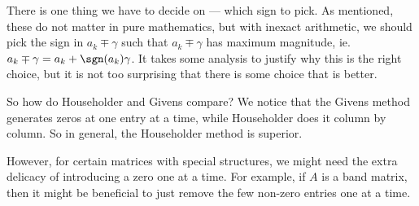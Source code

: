\documentclass[a4paper]{article}
\begin{document}
There is one thing we have to decide on --- which sign to pick. As mentioned, these do not matter in pure mathematics, but with inexact arithmetic, we should pick the sign in $a_k \mp \gamma$ such that $a_k \mp \gamma$ has maximum magnitude, ie. $a_k \mp \gamma = a_k + \sgn(a_k) \gamma$. It takes some analysis to justify why this is the right choice, but it is not too surprising that there is some choice that is better.

So how do Householder and Givens compare? We notice that the Givens method generates zeros at one entry at a time, while Householder does it column by column. So in general, the Householder method is superior.

However, for certain matrices with special structures, we might need the extra delicacy of introducing a zero one at a time. For example, if $A$ is a band matrix, then it might be beneficial to just remove the few non-zero entries one at a time.
\end{document}
